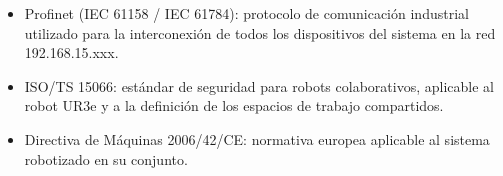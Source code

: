 \begin{itemize}
	\item Profinet (IEC 61158 / IEC 61784): protocolo de comunicación industrial utilizado para la interconexión de todos los dispositivos del sistema en la red 192.168.15.xxx.

	\item ISO/TS 15066: estándar de seguridad para robots colaborativos, aplicable al robot UR3e y a la definición de los espacios de trabajo compartidos.

	\item Directiva de Máquinas 2006/42/CE: normativa europea aplicable al sistema robotizado en su conjunto.
\end{itemize}
